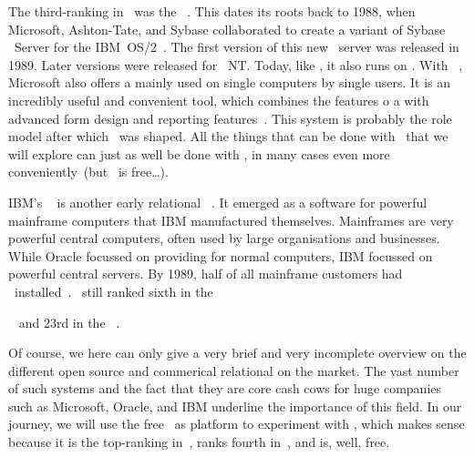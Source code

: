 The third-ranking  in~\cite{RS2025DERORD} was the \microsoftSqlServer~\cite{P2020MSS2ABG,A2024TSAFMSS2,W2018MSSDB}.
This  dates its roots back to 1988, when Microsoft, Ashton-Tate, and Sybase collaborated to create a variant of Sybase \sql\ Server for the  IBM~OS/2~\cite{W2018MSSDB:TEOMSS}.
The first version of this new \db\ server was released in 1989.
Later versions were released for \microsoftWindows~NT.
Today, like \oracleDB, it also runs on \linux.
With \microsoftAccess~\cite{LF2022MOSBSO2AM3}, Microsoft also offers a  mainly used on single computers by single users.
It is an incredibly useful and convenient tool, which combines the features o a  with advanced form design and reporting features~\cite{SSI2023MA2BTA,B2020HOMA2,UC2021AFD,MM2014RDAMA}.
This system is probably the role model after which \libreofficeBase\ was shaped.
All the things that can be done with \libreofficeBase\ that we will explore can just as well be done with \microsoftAccess, in many cases even more conveniently~(but \libreofficeBase\ is free\dots).

IBM's \ibmDB~\cite{CWDS2007UDLVWE,BBBCCDMMP2016SPTAFOIDFI} is another early relational \dbms~\cite{HS2013THAGOID}.
It emerged as a software for powerful mainframe computers that IBM manufactured themselves.
Mainframes are very powerful central computers, often used by large organisations and businesses.
While Oracle focussed on providing  for normal computers, IBM focussed on powerful central servers.
By 1989, half of all mainframe customers had \ibmDB\ installed~\cite{HS2013THAGOID}.
\ibmDB\ still ranked sixth in the~\begin{noglslink}\end{noglslink}~\cite{RS2025DERORD} and 23rd in the ~\cite{SE:SO:2024DS}.%
%
\endhsection%

Of course, we here can only give a very brief and very incomplete overview on the different open source and commerical relational  on the market.
The vast number of such systems and the fact that they are core cash cows for huge companies such as Microsoft, Oracle, and IBM underline the importance of this field.
In our journey, we will use the free \postgresql\ as platform to experiment with , which makes sense because it is the top-ranking  in~\cite{SE:SO:2024DS}, ranks fourth in~\cite{RS2025DERORD}, and is, well, free.%
%
\endhsection%
%
